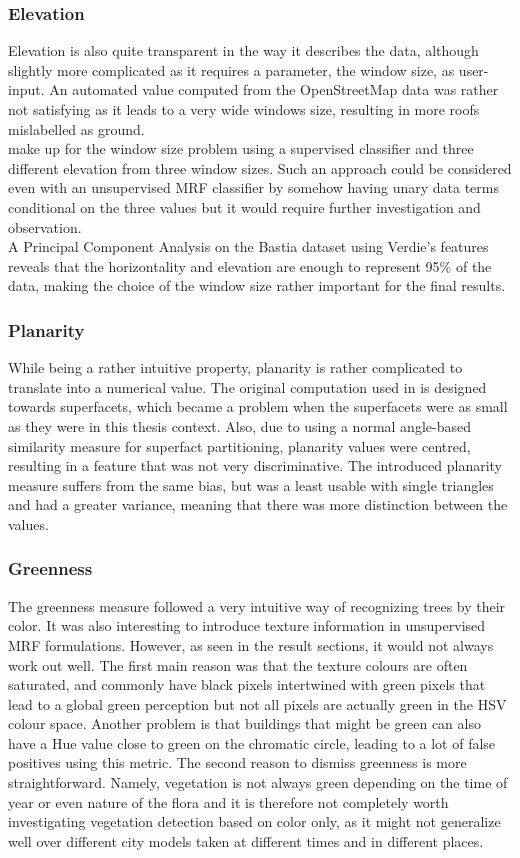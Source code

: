 \documentclass{kththesis}
\begin{document}
\subsubsection{Elevation}
Elevation is also quite transparent in the way it describes the data, although slightly more complicated as it requires a parameter, the window size, as user-input. An automated value computed from the OpenStreetMap data was rather not satisfying as it leads to a very wide windows size, resulting in more roofs mislabelled as ground. \\
\textcite{rouhani} make up for the window size problem using a supervised classifier and three different elevation from three window sizes. Such an approach could be considered even with an unsupervised MRF classifier by somehow having unary data terms conditional on the three values but it would require further investigation and observation. \\
A Principal Component Analysis on the Bastia dataset using Verdie's features \parencite{verdie} reveals that the horizontality and elevation are enough to represent 95\% of the data, making the choice of the window size rather important for the final results. 
\subsubsection{Planarity}
While being a rather intuitive property, planarity is rather complicated to translate into a numerical value. The original computation used in \textcite{rouhani, verdie} is designed towards superfacets, which became a problem when the superfacets were as small as they were in this thesis context. Also, due to using a normal angle-based similarity measure for superfact partitioning, planarity values were centred, resulting in a feature that was not very discriminative. The introduced planarity measure suffers from the same bias, but was a least usable with single triangles and had a greater variance, meaning that there was more distinction between the values. \\
\subsubsection{Greenness}
The greenness measure followed a very intuitive way of recognizing trees by their color. It was also interesting to introduce texture information in unsupervised MRF formulations. However, as seen in the result sections, it would not always work out well. The first main reason was that the texture colours are often saturated, and commonly have black pixels intertwined with green pixels that lead to a global green perception but not all pixels are actually green in the HSV colour space. Another problem is that buildings that might be green can also have a Hue value close to green on the chromatic circle, leading to a lot of false positives using this metric. The second reason to dismiss greenness is more straightforward. Namely, vegetation is not always green depending on the time of year or even nature of the flora and it is therefore not completely worth investigating vegetation detection based on color only, as it might not generalize well over different city models taken at different times and in different places. 
\end{document}
